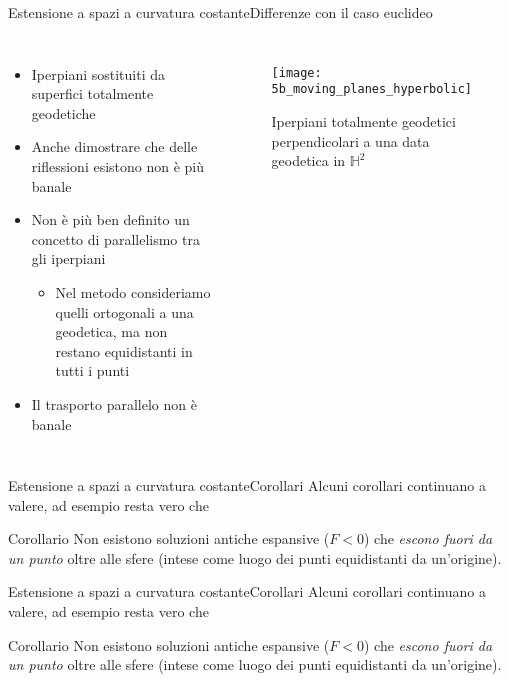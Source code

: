 \begin{frame}{Estensione a spazi a curvatura costante}{Differenze con il caso euclideo}
	\begin{columns}
		\begin{itemize}
			\item<1-> Iperpiani sostituiti da superfici totalmente geodetiche
			\item<2-> Anche dimostrare che delle riflessioni esistono non è più banale
			\item<3-> Non è più ben definito un concetto di parallelismo tra gli iperpiani 
			\begin{itemize}
				\item Nel metodo consideriamo quelli ortogonali a una geodetica, ma non restano equidistanti in tutti i punti
			\end{itemize}
			\item<4-> Il trasporto parallelo non è banale
		\end{itemize}
		\begin{figure}
			\begin{center}
				\texttt{[image: 5b\_moving\_planes\_hyperbolic]}
				\caption{Iperpiani totalmente geodetici perpendicolari a una data geodetica in $\mathbb{H}^2$}
			\end{center}
		\end{figure}
	\end{columns}
\end{frame}


\begin{frame}{Estensione a spazi a curvatura costante}{Corollari}
	Alcuni corollari continuano a valere, ad esempio resta vero che 
	\begin{block}{Corollario}
		Non esistono soluzioni antiche espansive ($F<0$) che \textit{escono fuori da un punto} oltre alle sfere (intese come luogo dei punti equidistanti da un'origine). 
	\end{block}
\end{frame}


\begin{frame}{Estensione a spazi a curvatura costante}{Corollari}
	Alcuni corollari continuano a valere, ad esempio resta vero che 
	\begin{block}{Corollario}
		Non esistono soluzioni antiche espansive ($F<0$) che \textit{escono fuori da un punto} oltre alle sfere (intese come luogo dei punti equidistanti da un'origine). 
	\end{block}
\end{frame}



